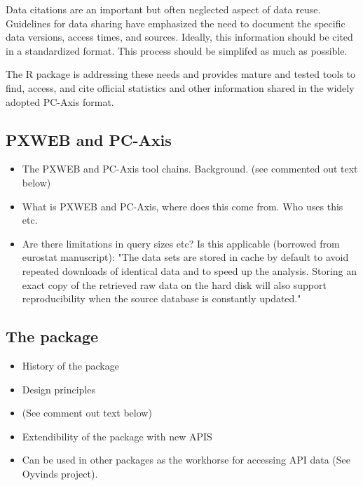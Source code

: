 Data citations are an important but often neglected aspect of data
reuse. Guidelines for data sharing have emphasized the need to
document the specific data versions, access times, and
sources. Ideally, this information should be cited in a standardized
format. This process should be simplifed as much as possible.


The  R package is addressing these needs and provides
mature and tested tools to find, access, and cite official statistics
and other information shared in the widely adopted PC-Axis format.


\subsection[PXWEB and PC-Axis]{PXWEB and PC-Axis}

\begin{itemize}
    \item The PXWEB and PC-Axis tool chains. Background. (see commented out text below)
    \item What is PXWEB and PC-Axis, where does this come from. Who uses this etc.
    \item Are there limitations in query sizes etc? Is this applicable (borrowed from eurostat manuscript): "The data sets are stored in cache by default to avoid repeated downloads of identical data and to speed up the analysis. Storing an exact copy of the retrieved raw data on the hard disk will also support reproducibility when the source database is constantly updated."
\end{itemize}


\subsection{The  package}

\begin{itemize}
    \item History of the package
    \item Design principles
    \item (See comment out text below)
    \item Extendibility of the package with new APIS
    \item Can be used in other packages as the workhorse for accessing API data (See Oyvinds project).
\end{itemize}

